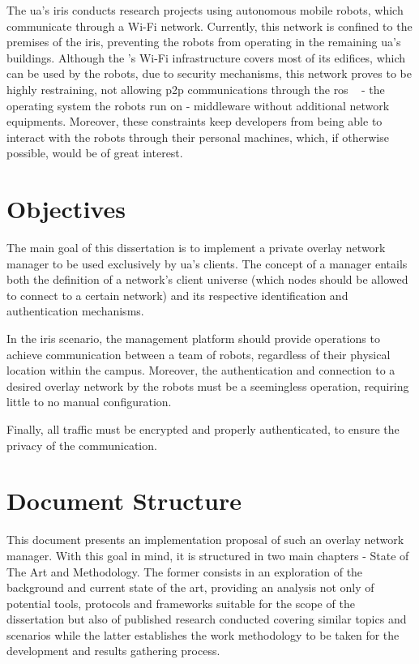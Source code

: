 \documentclass[11pt,twoside,a4paper]{report}
\begin{document}
The \acrfull{ua}'s \acrfull{iris} conducts research projects using autonomous mobile robots, which communicate through a Wi-Fi network. Currently, this network is confined to the premises of the \acrshort{iris}, preventing the robots from operating in the remaining \acrshort{ua}'s buildings. Although the 's Wi-Fi infrastructure covers most of its edifices, which can be used by the robots, due to security mechanisms, this network proves to be highly restraining, not allowing \acrfull{p2p} communications through the \acrfull{ros} ~\cite{quigley2009ros} - the operating system the robots run on - middleware without additional network equipments. Moreover, these constraints keep developers from being able to interact with the robots through their personal machines, which, if otherwise possible, would be of great interest.

\section{Objectives}

The main goal of this dissertation is to implement a private overlay network manager to be used exclusively by \acrshort{ua}'s clients. The concept of a manager entails both the definition of a network's client universe (which nodes should be allowed to connect to a certain network) and its respective identification and authentication mechanisms.

In the \acrshort{iris} scenario, the management platform should provide operations to achieve communication between a team of robots, regardless of their physical location within the campus. Moreover, the authentication and connection to a desired overlay network by the robots must be a seemingless operation, requiring little to no manual configuration.

Finally, all traffic must be encrypted and properly authenticated, to ensure the privacy of the communication.

\section{Document Structure}

This document presents an implementation proposal of such an overlay network manager. With this goal in mind, it is structured in two main chapters - State of The Art and Methodology. The former consists in an exploration of the background and current state of the art, providing an analysis not only of potential tools, protocols and frameworks suitable for the scope of the dissertation but also of published research conducted covering similar topics and scenarios while the latter establishes the work methodology to be taken for the development and results gathering process.
\end{document}

